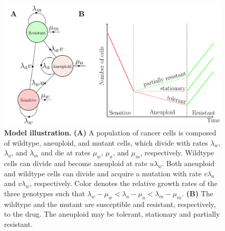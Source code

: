 \documentclass[12pt]{extarticle}
\begin{document}

\begin{figure}
\centering
\includegraphics[width=\textwidth]{Figures/figureAneuploidy.pdf}
\caption{
\textbf{Model illustration.}
\textbf{(A)} A population of cancer cells is composed of wildtype, aneuploid, and mutant cells, which divide with rates $\lambda_w$, $\lambda_a$, and $\lambda_m$ and die at rates $\mu_w$, $\mu_a$, and $\mu_m$, respectively. 
Wildtype cells can divide and become aneuploid at rate $u\lambda_w$. Both aneuploid and wildtype cells can divide and acquire a mutation with rate $v\lambda_a$ and $v\lambda_w$, respectively. Color denotes the relative growth rates of the three genotypes such that $\lambda_w - \mu_w < \lambda_a - \mu_a < \lambda_m - \mu_m$. \textbf{(B)} The wildtype and the mutant are susceptible and resistant, respectively, to the drug. The aneuploid may be tolerant, stationary and partially resistant.
}
\label{figureAneuploidy}
\end{figure}
\end{document}
